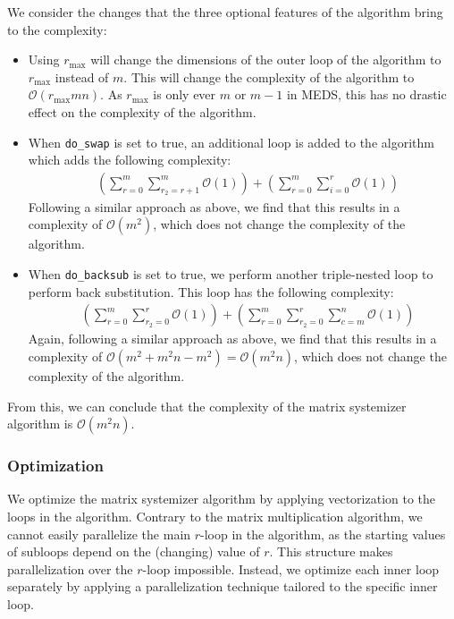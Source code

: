 \documentclass[11pt,a4paper]{report}
\theoremstyle{definition}
\begin{document}
We consider the changes that the three optional features of the algorithm bring to the complexity:
\begin{itemize}
  \item Using $r_\text{max}$ will change the dimensions of the outer loop of the algorithm to $r_\text{max}$ instead of $m$. This will change the complexity of the algorithm to $\mathcal{O}(r_\text{max}mn)$. As $r_\text{max}$ is only ever $m$ or $m-1$ in MEDS, this has no drastic effect on the complexity of the algorithm.
  \item When \texttt{do\_swap} is set to true, an additional loop is added to the algorithm which adds the following complexity:
        \begin{align*}
           & \left( \sum_{r=0}^{m} \sum_{r_2=r+1}^{m} \mathcal{O}(1) \right) + \left( \sum_{r=0}^{m} \sum_{i=0}^{r} \mathcal{O}(1) \right)
        \end{align*}
        Following a similar approach as above, we find that this results in a complexity of $\mathcal{O}(m^2)$, which does not change the complexity of the algorithm.
  \item When \texttt{do\_backsub} is set to true, we perform another triple-nested loop to perform back substitution. This loop has the following complexity:
        \begin{align*}
           & \left( \sum_{r=0}^{m} \sum_{r_2=0}^{r} \mathcal{O}(1) \right) + \left( \sum_{r=0}^{m} \sum_{r_2=0}^{r} \sum_{c=m}^{n} \mathcal{O}(1) \right)
        \end{align*}
        Again, following a similar approach as above, we find that this results in a complexity of $\mathcal{O}(m^2 + m^2n - m^2) = \mathcal{O}(m^2n)$, which does not change the complexity of the algorithm.
\end{itemize}
From this, we can conclude that the complexity of the matrix systemizer algorithm is $\mathcal{O}(m^2n)$.

\subsubsection{Optimization}
\label{sec:matrixsystemizeroptimization}
We optimize the matrix systemizer algorithm by applying vectorization to the loops in the algorithm. Contrary to the matrix multiplication algorithm, we cannot easily parallelize the main $r$-loop in the algorithm, as the starting values of subloops depend on the (changing) value of $r$. This structure makes parallelization over the $r$-loop impossible. Instead, we optimize each inner loop separately by applying a parallelization technique tailored to the specific inner loop.
\end{document}
